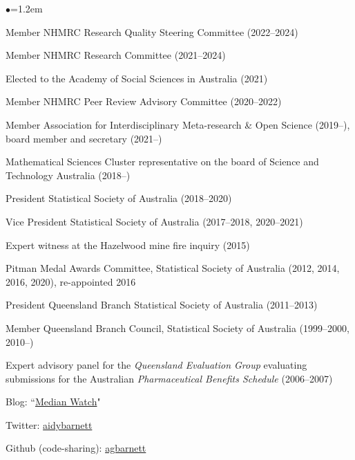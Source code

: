 \documentclass[a4paper,11pt]{article}
\renewcommand{\labelitemi}{$\bullet$}
\renewcommand{\labelitemii}{$\star$}
\begin{document}
\begin{raggedright}
\begin{list}{\labelitemi}{\leftmargin=1.2em}\addtolength{\itemsep}{-0.4\baselineskip}
\item Member NHMRC Research Quality Steering Committee (2022--2024)
\item Member NHMRC Research Committee (2021--2024)
\item Elected to the Academy of Social Sciences in Australia (2021)
\item Member NHMRC Peer Review Advisory Committee (2020--2022)
\item Member Association for Interdisciplinary Meta-research \& Open Science (2019--), board member and secretary (2021--)
\item Mathematical Sciences Cluster representative on the board of Science and Technology Australia (2018--)
\item President Statistical Society of Australia (2018--2020)
\item Vice President Statistical Society of Australia (2017--2018, 2020--2021)
\item Expert witness at the Hazelwood mine fire inquiry (2015)
\item Pitman Medal Awards Committee, Statistical Society of Australia (2012, 2014, 2016, 2020), re-appointed 2016
\item President Queensland Branch Statistical Society of Australia (2011--2013)
\item Member Queensland Branch Council, Statistical Society of Australia (1999--2000, 2010--)
\item Expert advisory panel for the \textit{Queensland Evaluation Group} evaluating submissions for the Australian \textit{Pharmaceutical Benefits Schedule} (2006--2007)
\item Blog: ``\href{https://medianwatch.netlify.com/}{Median Watch}"
\item Twitter: \href{https://twitter.com/aidybarnett}{aidybarnett}
\item Github (code-sharing): \href{https://github.com/agbarnett}{agbarnett}
\end{list}


\end{raggedright}
\end{document}
